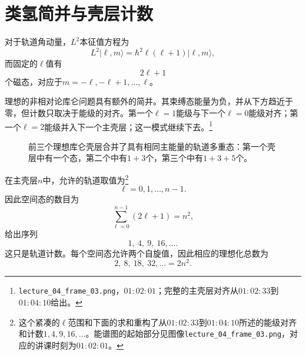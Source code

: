\section{类氢简并与壳层计数}

对于轨道角动量，\(L^{2}\)本征值方程为
\begin{equation}
L^{2}\lvert\ell,m\rangle
=\hbar^{2}\ell(\ell+1)\lvert\ell,m\rangle,
\end{equation}
而固定的\(\ell\)值有
\begin{equation}
2\ell+1
\end{equation}
个磁态，对应于\(m=-\ell,-\ell+1,\ldots,\ell\)。

理想的非相对论库仑问题具有额外的简并。其束缚态能量为负，并从下方趋近于零，但计数只取决于能级的对齐。第一个\(\ell=1\)能级与下一个\(\ell=0\)能级对齐；第一个\(\ell=2\)能级并入下一个主壳层；这一模式继续下去。\footnote{\texttt{lecture\_04\_frame\_03.png}，\(01{:}02{:}01\)；完整的主壳层对齐从\(01{:}02{:}33\)到\(01{:}04{:}10\)给出。}

\begin{figure}[htbp]
\centering
{}
\caption{前三个理想库仑壳层合并了具有相同主能量的轨道多重态：第一个壳层中有一个态，第二个中有\(1+3\)个，第三个中有\(1+3+5\)个。}
\end{figure}

在主壳层\(n\)中，允许的轨道取值为\footnote{这个紧凑的\(\ell\)范围和下面的求和重构了从\(01{:}02{:}33\)到\(01{:}04{:}10\)所述的能级对齐和计数\(1,4,9,16,\ldots\)。能谱图的起始部分见图像\texttt{lecture\_04\_frame\_03.png}，对应的讲课时刻为\(01{:}02{:}01\)。}
\[
\ell=0,1,\ldots,n-1.
\]
因此空间态的数目为
\begin{equation}
\sum_{\ell=0}^{n-1}(2\ell+1)=n^{2},
\end{equation}
给出序列
\begin{equation}
1,\ 4,\ 9,\ 16,\ldots .
\end{equation}
这只是轨道计数。每个空间态允许两个自旋值，因此相应的理想化总数为
\begin{equation}
2,\ 8,\ 18,\ 32,\ldots=2n^{2}.
\end{equation}

